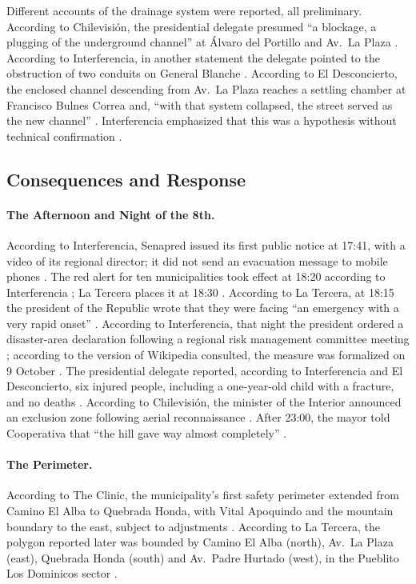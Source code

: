 Different accounts of the drainage system were reported, all preliminary. According to Chilevisión, the presidential delegate presumed ``a blockage, a plugging of the underground channel'' at Álvaro del Portillo and Av.\ La Plaza \citep{chilevision2026}. According to Interferencia, in another statement the delegate pointed to the obstruction of two conduits on General Blanche \citep{interferencia2026}. According to El Desconcierto, the enclosed channel descending from Av.\ La Plaza reaches a settling chamber at Francisco Bulnes Correa and, ``with that system collapsed, the street served as the new channel'' \citep{eldesconcierto2026}. Interferencia emphasized that this was a hypothesis without technical confirmation \citep{interferencia2026}.

\subsection*{Consequences and Response}
\paragraph{The Afternoon and Night of the 8th.} According to Interferencia, Senapred issued its first public notice at 17:41, with a video of its regional director; it did not send an evacuation message to mobile phones \citep{interferencia2026}. The red alert for ten municipalities took effect at 18:20 according to Interferencia \citep{interferencia2026}; La Tercera places it at 18:30 \citep{latercera2026lluvias}. According to La Tercera, at 18:15 the president of the Republic wrote that they were facing ``an emergency with a very rapid onset'' \citep{latercera2026lluvias}. According to Interferencia, that night the president ordered a disaster-area declaration following a regional risk management committee meeting \citep{interferencia2026}; according to the version of Wikipedia consulted, the measure was formalized on 9 October \citep{wikipedia2026}. The presidential delegate reported, according to Interferencia and El Desconcierto, six injured people, including a one-year-old child with a fracture, and no deaths \citep{interferencia2026,eldesconcierto2026}. According to Chilevisión, the minister of the Interior announced an exclusion zone following aerial reconnaissance \citep{chilevision2026mapa}. After 23:00, the mayor told Cooperativa that ``the hill gave way almost completely'' \citep{cooperativa2026alcaldesa}.

\paragraph{The Perimeter.} According to The Clinic, the municipality's first safety perimeter extended from Camino El Alba to Quebrada Honda, with Vital Apoquindo and the mountain boundary to the east, subject to adjustments \citep{theclinic2026frontal}. According to La Tercera, the polygon reported later was bounded by Camino El Alba (north), Av.\ La Plaza (east), Quebrada Honda (south) and Av.\ Padre Hurtado (west), in the Pueblito Los Dominicos sector \citep{latercera2026}.

